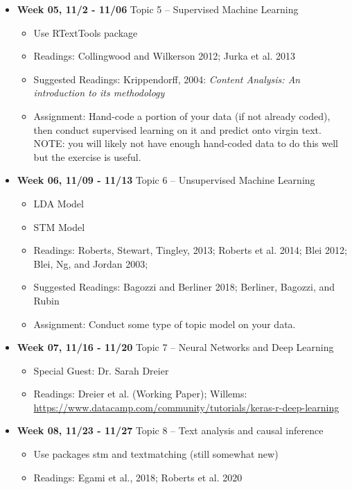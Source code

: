 \documentclass[11pt]{article}
\begin{document}
\begin{itemize}
	\item \textbf{Week 05, 11/2 - 11/06} Topic 5 -- Supervised Machine Learning
	\begin{itemize}
	\item Use RTextTools package
	\item Readings: Collingwood and Wilkerson 2012; Jurka et al. 2013
	\item Suggested Readings: Krippendorff, 2004: \emph{Content Analysis: An introduction to its methodology}
	\item Assignment: Hand-code a portion of your data (if not already coded), then conduct supervised learning on it and predict onto virgin text. NOTE: you will likely not have enough hand-coded data to do this well but the exercise is useful.
	\end{itemize}
\end{itemize}

\begin{itemize}
	\item \textbf{Week 06, 11/09 - 11/13} Topic 6 -- Unsupervised Machine Learning
	\begin{itemize}
	\item LDA Model
	\item STM Model
	\item Readings: Roberts, Stewart, Tingley, 2013; Roberts et al. 2014; Blei 2012; Blei, Ng, and Jordan 2003; 
	\item Suggested Readings: Bagozzi and Berliner 2018; Berliner, Bagozzi, and Rubin
	\item Assignment: Conduct some type of topic model on your data.
	\end{itemize}
\end{itemize}

\begin{itemize}
	\item \textbf{Week 07, 11/16 - 11/20} Topic 7 -- Neural Networks and Deep Learning 
	\begin{itemize}
	\item Special Guest: Dr. Sarah Dreier
	\item Readings: Dreier et al. (Working Paper); Willems: \href{https://www.datacamp.com/community/tutorials/keras-r-deep-learning}{https://www.datacamp.com/community/tutorials/keras-r-deep-learning}
	\end{itemize}
\end{itemize}

\begin{itemize}
	\item \textbf{Week 08, 11/23 - 11/27} Topic 8 -- Text analysis and causal inference
	\begin{itemize}
	\item Use packages stm and textmatching (still somewhat new)
	\item Readings: Egami et al., 2018; Roberts et al. 2020
	\end{itemize}
\end{itemize}
\end{document}
